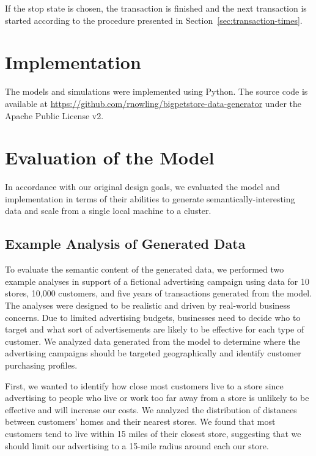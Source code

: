 \documentclass[conference]{IEEEtran}
\begin{document}
If the stop state is chosen, the transaction is finished and the next transaction is started according to the procedure presented in Section~\ref{sec:transaction-times}.


\section{Implementation}
The models and simulations were implemented using Python. The source code is available at \url{https://github.com/rnowling/bigpetstore-data-generator} under the Apache Public License v2.

\section{Evaluation of the Model}
In accordance with our original design goals, we evaluated the model and implementation in terms of their abilities to generate semantically-interesting data and scale from a single local machine to a cluster.

\subsection{Example Analysis of Generated Data}
To evaluate the semantic content of the generated data, we performed two example analyses in support of a fictional advertising campaign using data for 10 stores, 10,000 customers, and five years of transactions generated from the model. The analyses were designed to be realistic and driven by real-world business concerns.  Due to limited advertising budgets, businesses need to decide who to target and what sort of advertisements are likely to be effective for each type of customer.  We analyzed data generated from the model to determine where the advertising campaigns should be targeted geographically and identify customer purchasing profiles.

First, we wanted to identify how close most customers live to a store since advertising to people who live or work too far away from a store is unlikely to be effective and will increase our costs. We analyzed the distribution of distances between customers' homes and their nearest stores.  We found that most customers tend to live within 15 miles of their closest store, suggesting that we should limit our advertising to a 15-mile radius around each our store.
\end{document}
